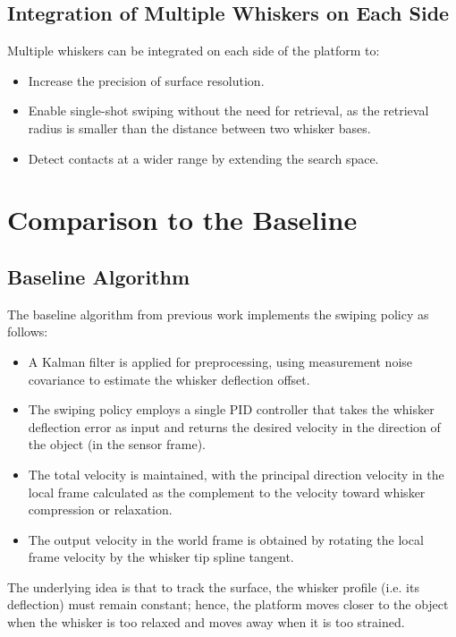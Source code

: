 \subsection{Integration of Multiple Whiskers on Each Side}

Multiple whiskers can be integrated on each side of the platform to:
\begin{itemize}
    \item Increase the precision of surface resolution.
    \item Enable single-shot swiping without the need for retrieval, as the retrieval radius is smaller than the distance between two whisker bases.
    \item Detect contacts at a wider range by extending the search space.
\end{itemize}


\section{Comparison to the Baseline}

\subsection{Baseline Algorithm}

The baseline algorithm from previous work implements the swiping policy as follows:
\begin{itemize}
    \item A Kalman filter is applied for preprocessing, using measurement noise covariance to estimate the whisker deflection offset.
    \item The swiping policy employs a single PID controller that takes the whisker deflection error as input and returns the desired velocity in the direction of the object (in the sensor frame).
    \item The total velocity is maintained, with the principal direction velocity in the local frame calculated as the complement to the velocity toward whisker compression or relaxation.
    \item The output velocity in the world frame is obtained by rotating the local frame velocity by the whisker tip spline tangent.
\end{itemize}
The underlying idea is that to track the surface, the whisker profile (i.e. its deflection) must remain constant; hence, the platform moves closer to the object when the whisker is too relaxed and moves away when it is too strained.

